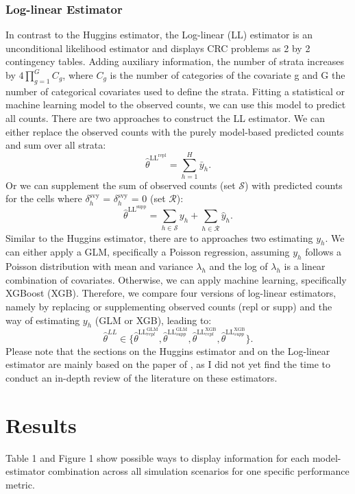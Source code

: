 \documentclass[12pt, a4paper]{article}
\begin{document}
\subsubsection*{Log-linear Estimator}
\noindent In contrast to the Huggins estimator, the Log-linear (LL) estimator \parencite{fienberg1972multiple} is an unconditional likelihood estimator and displays CRC problems as 2 by 2 contingency tables. Adding auxiliary information, the number of strata increases by $4\prod_{g=1}^G C_g$, where $C_g$ is the number of categories of the covariate g and G the number of categorical covariates used to define the strata. Fitting a statistical or machine learning model to the observed counts, we can use this model to predict all counts. There are two approaches to construct the LL estimator. We can either replace the observed counts with the purely model-based predicted counts and sum over all strata:
$$\hat\theta^{\text{LL}^{\text{repl}}} = \sum_{h=1}^H \bar y_h.$$
\noindent Or we can supplement the sum of observed counts (set $\mathcal{S}$) with predicted counts for the cells where $\delta_h^{\text{svy}}$ = $\delta_h^{\text{svy}}$ = 0 (set $\mathcal{R}$):
$$\hat\theta^{\text{LL}^{\text{supp}}} = \sum_{h \in \mathcal{S}} y_h + \sum_{h \in \mathcal{R}} \hat y_h .$$
Similar to the Huggins estimator, there are to approaches two estimating $y_h$. We can either apply a GLM, specifically a Poisson regression, assuming $y_h$ follows a Poisson distribution with mean and variance $\lambda_h$ and the log of $\lambda_h$ is a linear combination of covariates. Otherwise, we can apply machine learning, specifically XGBoost (XGB). Therefore, we compare four versions of log-linear estimators, namely by replacing or supplementing observed counts (repl or supp) and the way of estimating $y_h$ (GLM or XGB), leading to: 
$$ \hat\theta^{LL} \in \{\hat\theta^{\text{LL}^{\text{GLM}}_{repl}}, \hat\theta^{\text{LL}^{\text{GLM}}_{supp}},  \hat\theta^{\text{LL}^{\text{XGB}}_{repl}}, \hat\theta^{\text{LL}^{\text{XGB}}_{supp}} \}.$$
\noindent Please note that the sections on the Huggins estimator and on the Log-linear estimator are mainly based on the paper of \textcite{walraad2024MLCRC}, as I did not yet find the time to conduct an in-depth review of the literature on these estimators. 

\section{Results}
\noindent Table 1 and Figure 1 show possible ways to display information for each model-estimator combination across all simulation scenarios for one specific performance metric.
\end{document}
